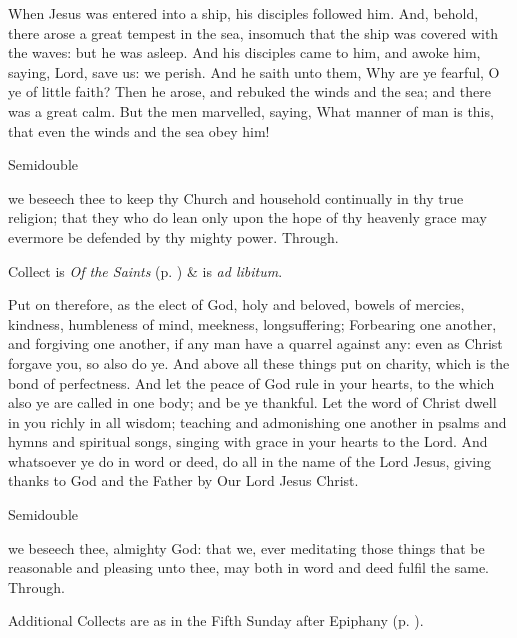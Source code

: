  When Jesus was entered into a ship, his disciples followed him. And, behold, there arose a great tempest in the sea, insomuch that the ship was covered with the waves: but he was asleep. And his disciples came to him, and awoke him, saying, Lord, save us: we perish. And he saith unto them, Why are ye fearful, O ye of little faith? Then he arose, and rebuked the winds and the sea; and there was a great calm. But the men marvelled, saying, What manner of man is this, that even the winds and the sea obey him!


\label{EpiphanyV}
\begin{inhead}
{Semidouble}
\end{inhead}
\collect
{} we beseech thee to keep thy Church and household continually in thy true religion; that they who do lean only upon the hope of thy heavenly grace may evermore be defended by thy mighty power. Through.
\begin{rubric}
     Collect is \emph{Of the Saints} (p. \pageref{SPSaints}) \&  is \emph{ad libitum}.
\end{rubric}
 Put on therefore, as the elect of God, holy and beloved, bowels of mercies, kindness, humbleness of mind, meekness, longsuffering; Forbearing one another, and forgiving one another, if any man have a quarrel against any: even as Christ forgave you, so also do ye. And above all these things put on charity, which is the bond of perfectness. And let the peace of God rule in your hearts, to the which also ye are called in one body; and be ye thankful. Let the word of Christ dwell in you richly in all wisdom; teaching and admonishing one another in psalms and hymns and spiritual songs, singing with grace in your hearts to the Lord. And whatsoever ye do in word or deed, do all in the name of the Lord Jesus, giving thanks to God and the Father by %
Our Lord Jesus Christ.


\begin{inhead}
{Semidouble}
\end{inhead}

\collect
{} we beseech thee, almighty God: that we, ever meditating those things that be reasonable and pleasing unto thee, may both in word and deed fulfil the same. Through.
\begin{rubric}
    Additional Collects are as in the Fifth Sunday after Epiphany (p. \pageref{EpiphanyV}).
\end{rubric}

